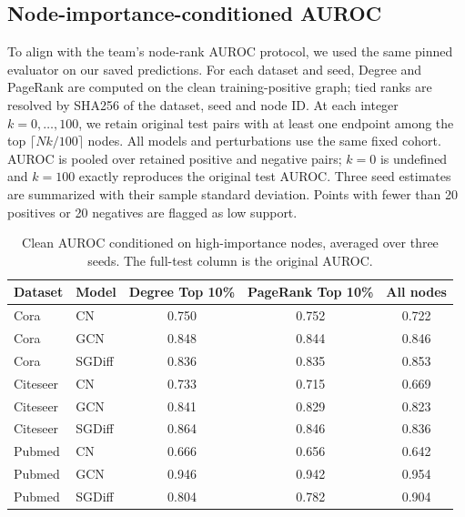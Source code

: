 \subsection{Node-importance-conditioned AUROC}

To align with the team's node-rank AUROC protocol, we used the same pinned evaluator on our saved predictions. For each dataset and seed, Degree and PageRank are computed on the clean training-positive graph; tied ranks are resolved by SHA256 of the dataset, seed and node ID. At each integer $k=0,\ldots,100$, we retain original test pairs with at least one endpoint among the top $\lceil Nk/100\rceil$ nodes. All models and perturbations use the same fixed cohort. AUROC is pooled over retained positive and negative pairs; $k=0$ is undefined and $k=100$ exactly reproduces the original test AUROC. Three seed estimates are summarized with their sample standard deviation. Points with fewer than 20 positives or 20 negatives are flagged as low support.

\begin{table}[H]

\centering

\small

\begin{tabular}{llccc}

\toprule

Dataset & Model & Degree Top 10\% & PageRank Top 10\% & All nodes \\

\midrule

Cora & CN & 0.750 & 0.752 & 0.722 \\

Cora & GCN & 0.848 & 0.844 & 0.846 \\

Cora & SGDiff & 0.836 & 0.835 & 0.853 \\

\midrule

Citeseer & CN & 0.733 & 0.715 & 0.669 \\

Citeseer & GCN & 0.841 & 0.829 & 0.823 \\

Citeseer & SGDiff & 0.864 & 0.846 & 0.836 \\

\midrule

Pubmed & CN & 0.666 & 0.656 & 0.642 \\

Pubmed & GCN & 0.946 & 0.942 & 0.954 \\

Pubmed & SGDiff & 0.804 & 0.782 & 0.904 \\

\bottomrule

\end{tabular}

\caption{Clean AUROC conditioned on high-importance nodes, averaged over three seeds. The full-test column is the original AUROC.}

\label{tab:noderank}

\end{table}


